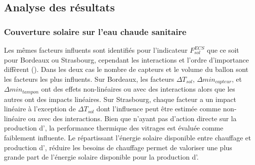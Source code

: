 \subsection{Analyse des résultats} %
\label{sub:analyse_des_resultats_morris}
\subsubsection{Couverture solaire sur l’eau chaude sanitaire} %
\label{ssub:couverture_solaire_sur_l_ECS}
Les mêmes facteurs influents sont identifiés pour l’indicateur $F_{sol}^{ECS}$ que ce soit
pour Bordeaux ou Strasbourg, cependant les interactions et l’ordre d’importance diffèrent
(). Dans les deux cas le nombre de capteurs  et le
volume du ballon  sont les facteurs les plus influents. Sur Bordeaux, les
facteurs $\Delta T_{sol}$, $\Delta min_{capteur}$, et $\Delta min_{tampon}$ ont des effets
non-linéaires ou avec des interactions alors que les autres ont des impacts linéaires. Sur
Strasbourg, chaque facteur a un impact linéaire à l’exception de $\Delta T_{sol}$ dont
l’influence peut être estimée comme non-linéaire ou avec des interactions. Bien que
n’ayant pas d’action directe sur la production d’, la performance thermique des
vitrages est évaluée comme faiblement influente. Le  répartissant l’énergie
solaire disponible entre chauffage et production d’, réduire les besoins de
chauffage permet de valoriser une plus grande part de l’énergie solaire disponible pour la
production d’.


